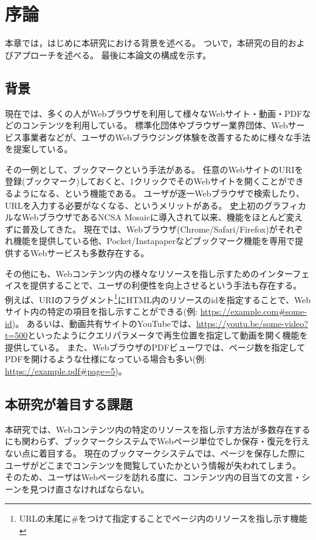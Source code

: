 \chapter{序論}
\label{chap:introduction}

本章では，はじめに本研究における背景を述べる。
ついで，本研究の目的およびアプローチを述べる。
最後に本論文の構成を示す。

\section{背景}
\label{section:background}

現在では、多くの人がWebブラウザを利用して様々なWebサイト・動画・PDFなどのコンテンツを利用している。
標準化団体やブラウザー業界団体、Webサービス事業者などが、ユーザのWebブラウジング体験を改善するために様々な手法を提案している。

その一例として、ブックマークという手法がある。
任意のWebサイトのURIを登録(ブックマーク)しておくと、1クリックでそのWebサイトを開くことができるようになる、という機能である。
ユーザが逐一Webブラウザで検索したり、URLを入力する必要がなくなる、というメリットがある。
史上初のグラフィカルなWebブラウザであるNCSA Mosaic\cite{ncsa-mosaic}に導入されて以来、機能をほとんど変えずに普及してきた。
現在では、Webブラウザ(Chrome\cite{chrome}/Safari\cite{safari}/Firefox\cite{firefox})がそれぞれ機能を提供している他、Pocket\cite{pocket}/Instapaper\cite{instapaper}などブックマーク機能を専用で提供するWebサービスも多数存在する。

その他にも、Webコンテンツ内の様々なリソースを指し示すためのインターフェイスを提供することで、ユーザの利便性を向上させるという手法も存在する。
例えば、URIのフラグメント\footnote{URLの末尾に\#をつけて指定することでページ内のリソースを指し示す機能}にHTML内のリソースのidを指定することで、Webサイト内の特定の項目を指し示すことができる(例: \url{https://example.com#some-id})。
あるいは、動画共有サイトのYouTube\cite{youtube}では、\url{https://youtu.be/some-video?t=500}といったようにクエリパラメータで再生位置を指定して動画を開く機能を提供している。
また、WebブラウザのPDFビューワでは、ページ数を指定してPDFを開けるような仕様になっている場合も多い\cite{browser-pdf-viewer-pdf-page-num-function}(例: \url{https://example.pdf#page=5})。

\section{本研究が着目する課題}
本研究では、Webコンテンツ内の特定のリソースを指し示す方法が多数存在するにも関わらず、ブックマークシステムでWebページ単位でしか保存・復元を行えない点に着目する。
現在のブックマークシステムでは、ページを保存した際にユーザがどこまでコンテンツを閲覧していたかという情報が失われてしまう。
そのため、ユーザはWebページを訪れる度に、コンテンツ内の目当ての文言・シーンを見つけ直さなければならない。

